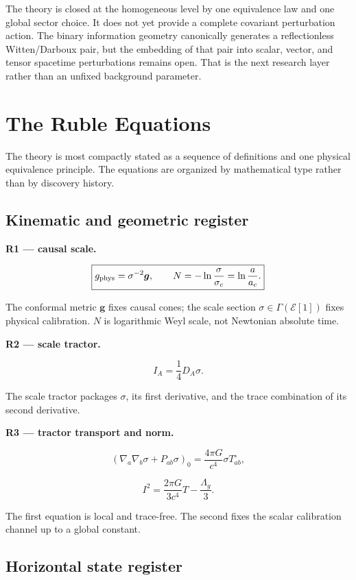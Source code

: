 \documentclass[
  11pt,
  letterpaper,
]{article}
\begin{document}
The theory is closed at the homogeneous level by one equivalence law and
one global sector choice. It does not yet provide a complete covariant
perturbation action. The binary information geometry canonically
generates a reflectionless Witten/Darboux pair, but the embedding of
that pair into scalar, vector, and tensor spacetime perturbations
remains open. That is the next research layer rather than an unfixed
background parameter.

\section{The Ruble Equations}\label{the-ruble-equations}

The theory is most compactly stated as a sequence of definitions and one
physical equivalence principle. The equations are organized by
mathematical type rather than by discovery history.

\subsection{Kinematic and geometric
register}\label{kinematic-and-geometric-register}

\textbf{R1 --- causal scale.}

\[
\boxed{
g_{\rm phys}=\sigma^{-2}\boldsymbol g,
\qquad
N=-\ln\frac{\sigma}{\sigma_c}=\ln\frac{a}{a_c}.
}
\]

The conformal metric \(\boldsymbol g\) fixes causal cones; the scale
section \(\sigma\in\Gamma(\mathcal E[1])\) fixes physical calibration.
\(N\) is logarithmic Weyl scale, not Newtonian absolute time.

\textbf{R2 --- scale tractor.}

\[
\boxed{
I_A=\frac14D_A\sigma.
}
\]

The scale tractor packages \(\sigma\), its first derivative, and the
trace combination of its second derivative.

\textbf{R3 --- tractor transport and norm.}

\[
\boxed{
\left(\nabla_a\nabla_b\sigma+P_{ab}\sigma\right)_0
=\frac{4\pi G}{c^4}\sigma T_{ab}^{\circ},
}
\]

\[
\boxed{
I^2=\frac{2\pi G}{3c^4}T-\frac{\Lambda_g}{3}.
}
\]

The first equation is local and trace-free. The second fixes the scalar
calibration channel up to a global constant.

\subsection{Horizontal state register}\label{horizontal-state-register}
\end{document}

